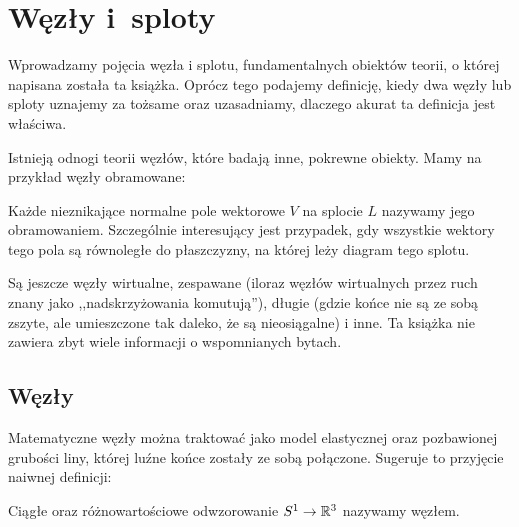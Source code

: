 
\section{Węzły i~sploty}
Wprowadzamy pojęcia węzła i splotu, fundamentalnych obiektów teorii, o której napisana została ta książka.
Oprócz tego podajemy definicję, kiedy dwa węzły lub sploty uznajemy za tożsame oraz uzasadniamy, dlaczego akurat ta definicja jest właściwa.

Istnieją odnogi teorii węzłów, które badają inne, pokrewne obiekty.
Mamy na przykład węzły obramowane:

\begin{definition}[obramowanie]
%
%
    Każde nieznikające normalne pole wektorowe $V$ na splocie $L$ nazywamy jego obramowaniem.
    Szczególnie interesujący jest przypadek, gdy wszystkie wektory tego pola są równoległe do płaszczyzny, na której leży diagram tego splotu.
\end{definition}

Są jeszcze węzły wirtualne, zespawane (iloraz węzłów wirtualnych przez ruch znany jako ,,nadskrzyżowania komutują''), długie (gdzie końce nie są ze sobą zszyte, ale umieszczone tak daleko, że są nieosiągalne) i inne.
%
%
%
Ta książka nie zawiera zbyt wiele informacji o wspomnianych bytach.

\subsection{Węzły}
Matematyczne węzły można traktować jako model elastycznej oraz pozbawionej grubości liny, której luźne końce zostały ze sobą połączone.
Sugeruje to przyjęcie naiwnej definicji:

\begin{definition}
%
    Ciągłe oraz różnowartościowe odwzorowanie $S^1 \to \mathbb R^3$ nazywamy węzłem.
\end{definition}

